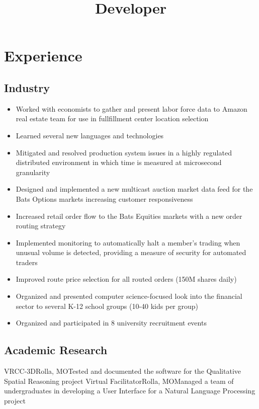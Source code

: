 \documentclass[10pt,a4paper,sans]{moderncv}        %
\title{Developer}
\begin{document}
\makecvtitle

\section{Experience}
\subsection{Industry}
\begin{itemize}
\item Worked with economists to gather and present labor force data to Amazon real estate team for use in fullfillment center location selection
\item Learned several new languages and technologies
\makenewline
\makenewline
\end{itemize}
\begin{itemize}
\item Mitigated and resolved production system issues in a highly regulated distributed environment in which time is measured at microsecond granularity
\item Designed and implemented a new multicast auction market data feed for the Bats Options markets increasing customer responsiveness
\item Increased retail order flow to the Bats Equities markets with a new order routing strategy
\item Implemented monitoring to automatically halt a member's trading when unusual volume is detected, providing a measure of security for automated traders
\item Improved route price selection for all routed orders (150M shares daily)
\item Organized and presented computer science-focused look into the financial sector to several K-12 school groups (10-40 kids per group)
\item Organized and participated in 8 university recruitment events

\end{itemize}

\subsection{Academic Research}
{VRCC-3D}{Rolla, MO}{}{Tested and documented the software for the Qualitative Spatial Reasoning project}
{Virtual Facilitator}{Rolla, MO}{}{Managed a team of undergraduates in developing a User Interface for a Natural Language Processing project}
\end{document}
